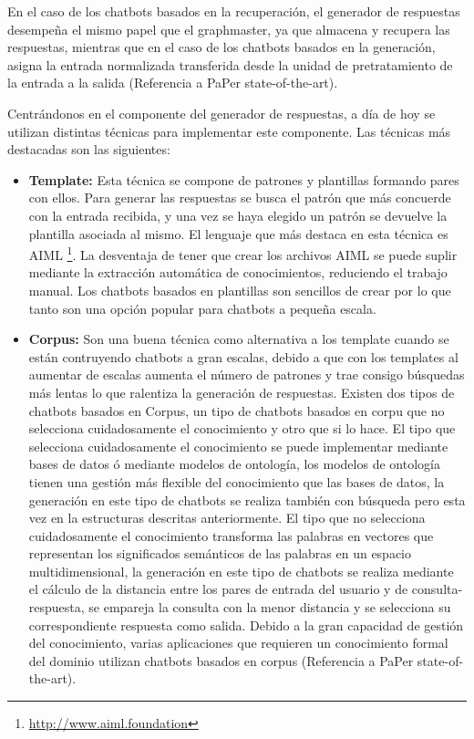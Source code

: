 En el caso de los chatbots basados en la recuperación, el generador de respuestas desempeña el mismo papel que el graphmaster, ya que almacena y recupera las respuestas, mientras que en el caso de los chatbots basados en la generación, asigna la entrada normalizada transferida desde la unidad de pretratamiento de la entrada a la salida (Referencia a PaPer state-of-the-art).

Centrándonos en el componente del generador de respuestas, a día de hoy se utilizan distintas técnicas para implementar este componente. Las técnicas más destacadas son las siguientes:

\begin{itemize}
    \item \textbf{Template:} Esta técnica se compone de patrones y plantillas formando pares con ellos. Para generar las respuestas se busca el patrón que más concuerde con la entrada recibida, y una vez se haya elegido un patrón se devuelve la plantilla asociada al mismo. El lenguaje que más destaca en esta técnica es AIML \footnote{\url{http://www.aiml.foundation}}. La desventaja de tener que crear los archivos AIML se puede suplir mediante la extracción automática de conocimientos, reduciendo el trabajo manual. Los chatbots basados en plantillas son sencillos de crear por lo que tanto son una opción popular para chatbots a pequeña escala.
    \item \textbf{Corpus:} Son una buena técnica como alternativa a los template cuando se están contruyendo chatbots a gran escalas, debido a que con los templates al aumentar de escalas aumenta el número de patrones y trae consigo búsquedas más lentas lo que ralentiza la generación de respuestas. Existen dos tipos de chatbots basados en Corpus, un tipo de chatbots basados en corpu que no selecciona cuidadosamente el conocimiento y otro que si lo hace. El tipo que selecciona cuidadosamente el conocimiento se puede implementar mediante bases de datos ó mediante modelos de ontología, los modelos de ontología tienen una gestión más flexible del conocimiento que las bases de datos, la generación en este tipo de chatbots se realiza también con búsqueda pero esta vez en la estructuras descritas anteriormente. El tipo que no selecciona cuidadosamente el conocimiento transforma las palabras en vectores que representan los significados semánticos de las palabras en un espacio multidimensional, la generación en este tipo de chatbots se realiza mediante el cálculo de la distancia entre los pares de entrada del usuario y de consulta-respuesta, se empareja la consulta con la menor distancia y se selecciona su correspondiente respuesta como salida. Debido a la gran capacidad de gestión del conocimiento, varias aplicaciones que requieren un conocimiento formal del dominio utilizan chatbots basados en corpus (Referencia a PaPer state-of-the-art).

\end{itemize}
